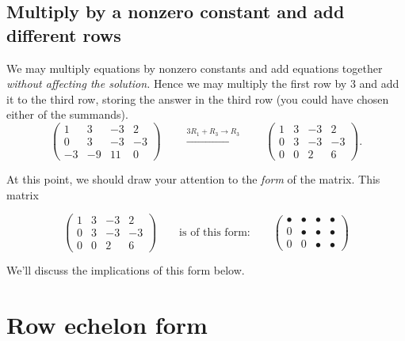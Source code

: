 \documentclass{ximera}
\begin{document}
\subsection{Multiply by a nonzero constant and add different rows}
We may multiply equations by nonzero constants and add equations together
\emph{without affecting the solution.} Hence we may multiply the first
row by $3$ and add it to the third row, storing the answer in the
third row (you could have chosen either of the summands).
\[
  \left(
    \begin{array}{ccc|c}
      1 &   3 & -3 & 2  \\
      0 &   3 & -3 & -3 \\
      -3& -9  & 11 & 0
    \end{array}
  \right)
  \qquad\xrightarrow{3R_1+R_3\rightarrow R_3}\qquad
  \left(
    \begin{array}{ccc|c}
      1 &   3 & -3 & 2  \\
      0 &   3 & -3 & -3 \\
      0& 0  & 2 & 6
    \end{array}
  \right).
\]

\begin{question}
\end{question}



At this point, we should draw your attention to the \emph{form} of the matrix. This matrix

\[
\begin{pmatrix}
  1 &   3 & -3 & 2  \\
  0 &   3 & -3 & -3 \\
  0& 0  & 2 & 6
\end{pmatrix}
\qquad
\text{is of this form:}
\qquad
\begin{pmatrix}
  \bullet & \bullet & \bullet & \bullet \\
     0   & \bullet & \bullet & \bullet \\
     0  &    0 & \bullet & \bullet
\end{pmatrix}
\]



We'll discuss the implications of this form below.


\section{Row echelon form}
\end{document}

